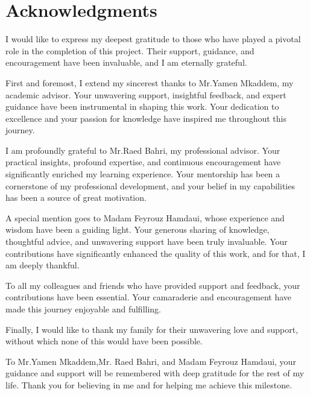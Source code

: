 \chapter*{Acknowledgments}


I would like to express my deepest gratitude to those who have played a pivotal role in the completion of this project. Their support, guidance, and encouragement have been invaluable, and I am eternally grateful.
\vspace{10pt}

First and foremost, I extend my sincerest thanks to Mr.Yamen Mkaddem, my academic advisor. Your unwavering support, insightful feedback, and expert guidance have been instrumental in shaping this work. Your dedication to excellence and your passion for knowledge have inspired me throughout this journey.
\vspace{10pt}

I am profoundly grateful to Mr.Raed Bahri, my professional advisor. Your practical insights, profound expertise, and continuous encouragement have significantly enriched my learning experience. Your mentorship has been a cornerstone of my professional development, and your belief in my capabilities has been a source of great motivation.
\vspace{10pt}

A special mention goes to Madam Feyrouz Hamdaui, whose experience and wisdom have been a guiding light. Your generous sharing of knowledge, thoughtful advice, and unwavering support have been truly invaluable. Your contributions have significantly enhanced the quality of this work, and for that, I am deeply thankful.
\vspace{10pt}

To all my colleagues and friends who have provided support and feedback, your contributions have been essential. Your camaraderie and encouragement have made this journey enjoyable and fulfilling.
\vspace{10pt}

Finally, I would like to thank my family for their unwavering love and support, without which none of this would have been possible.
\vspace{10pt}

To Mr.Yamen Mkaddem,Mr. Raed Bahri, and Madam Feyrouz Hamdaui, your guidance and support will be remembered with deep gratitude for the rest of my life. Thank you for believing in me and for helping me achieve this milestone.
